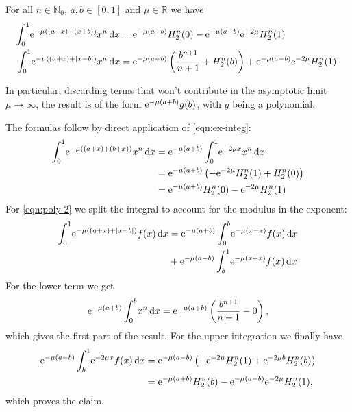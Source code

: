 \begin{Lemma}
  \label{lem:asymp-1}
  For all $n\in\mathbb{N}_0$, $a,b\in[0,1]$ and $\mu\in\mathbb{R}$ we
  have
  \begin{align}
    \label{eqn:poly-1}
    \Int{x}{\Eto{-\mu((a + x) + (x + b))} x^n} &= \Eto{-\mu(a+b)}H_2^n(0) -
    \Eto{-\mu(a-b)}\Eto{-2\mu}H^n_2(1) \\
    \label{eqn:poly-2}
    \Int{x}{\Eto{-\mu((a + x) + \Abs{x - b})}x^n} &=
    \Eto{-\mu(a+b)}\left(\frac{b^{n+1}}{n+1} + H_2^n(b)\right) +
    \Eto{-\mu(a-b)}\Eto{-2\mu}H^n_2(1).
  \end{align}
  \begin{Remark}
    In particular, discarding terms that won't contribute in the asymptotic limit
    $\mu\to\infty$, the result is of the form $\Eto{-\mu(a+b)}g(b)$, with $g$
    being a polynomial.
  \end{Remark}
  \begin{Proof}
    The formulas follow by direct application of \eqref{eqn:ex-integ}:
    \begin{align*}
      \Int{x}{\Eto{-\mu((a+x)+(b+x))}x^n} &= \Eto{-\mu(a+b)}\Int{x}{\Eto{-2\mu x}x^n} \\
        &= \Eto{-\mu(a+b)}\left(-\Eto{-2\mu}H^n_2(1) + H^n_2(0)\right) \\
        &= \Eto{-\mu(a+b)} H^n_2(0) - \Eto{-2\mu} H^n_2(1)
    \end{align*}
    For \eqref{eqn:poly-2} we split the integral to account for the modulus in
    the exponent:
    \begin{align*}
      \Int{x}{\Eto{-\mu( (a+x) + \Abs{x - b})}f(x)} &=
      \Eto{-\mu(a+b)}\Integ[b]{0}{x}{\Eto{-\mu(x-x)}f(x)} \\ &+
      \Eto{-\mu(a-b)}\Integ[1]{b}{x}{\Eto{-\mu(x+x)}f(x)}
    \end{align*}
    For the lower term we get
    \begin{align*}
      \Eto{-\mu(a+b)}\Integ[b]{0}{x}{x^n} =
      \Eto{-\mu(a+b)}\left(\frac{b^{n+1}}{n+1} - 0\right),
    \end{align*}
    which gives the first part of the result. For the upper integration we
    finally have
    \begin{align*}
      \Eto{-\mu(a-b)}\Integ[1]{b}{x}{\Eto{-2\mu x}f(x)} &=
      \Eto{-\mu(a-b)}\left(-\Eto{-2\mu}H^n_2(1) + \Eto{-2\mu b}H^n_2(b)\right) \\
      &= \Eto{-\mu(a+b)}H^n_2(b) - \Eto{-\mu(a-b)}\Eto{-2\mu}H^n_2(1),
    \end{align*}
    which proves the claim.
  \end{Proof}
\end{Lemma}
